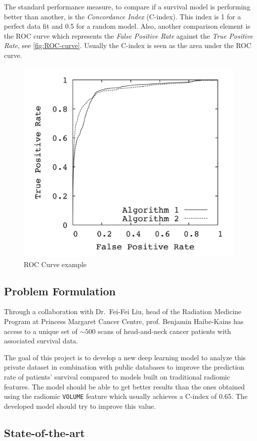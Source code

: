 The standard performance measure, to compare if a survival 
model is performing better than another, is the \emph{Concordance Index} (C-index). This 
index is 1 for a perfect data fit and 0.5 for a random model. Also, another comparison 
element is the ROC curve which represents the \emph{False Positive Rate} against the 
\emph{True Positive Rate}, see \autoref{fig:ROC-curve}. Usually the C-index is seen as 
the area under the ROC curve.
~\cites{neural:ROC-precision-recall}{medical:RankingCI}

\begin{figure}
  \centering
  \includegraphics[width=.5\linewidth]{images/roc_curve}
  \caption{ROC Curve example\label{fig:ROC-curve}}
\end{figure}

\subsection{Problem Formulation}

Through a collaboration with Dr.~Fei-Fei Liu, head of the Radiation Medicine Program at Princess
Margaret Cancer Centre, prof. Benjamin Haibe-Kains has access to a unique set of \( {\sim}500 \) 
scans of head-and-neck cancer patients with associated survival data. 

The goal of this project is to develop a new deep learning model to analyze this private 
dataset in combination with public databases to improve the prediction rate of patients' 
survival compared to models built on traditional radiomic features. The model should be 
able to get better results than the ones obtained using the radiomic \texttt{VOLUME} feature
which usually achieves a C-index of 0.65. The developed model should try to improve this value.

\subsection{State-of-the-art}

